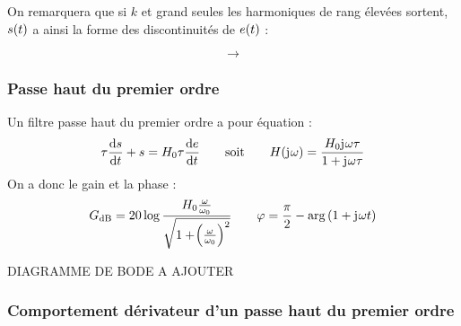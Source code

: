 \documentclass[a4paper,french,bookmarks]{book}
\begin{document}
    On remarquera que si $k$ et grand seules les harmoniques de rang élevées sortent, $s\!\left(t\right)$ a ainsi la forme des discontinuités de $e\!\left(t\right)$ :
    
    
    \begin{minipage}{0.48\linewidth}
        \begin{center}
        \end{center}
    \end{minipage}
    \begin{minipage}{0.04\linewidth}
        \[ \rightarrow \]
    \end{minipage}
    \begin{minipage}{0.48\linewidth}
        \begin{center}
        \end{center}
    \end{minipage}
    
    \subsubsection{Passe haut du premier ordre}
    
    Un filtre passe haut du premier ordre a pour équation :
    \[ \tau \dfrac{\mathrm d s}{\mathrm d t} + s = H_0\tau \dfrac{\mathrm d e}{\mathrm d t} \qquad\text{soit}\qquad H\!\left(\mathrm{j\mkern1mu}\omega\right) = \dfrac{H_0\mathrm{j\mkern1mu} \omega \tau}{1 + \mathrm{j\mkern1mu}\omega \tau}\]
    On a donc le gain et la phase :
    \[ G_\text{dB} = 20\log \dfrac{H_0\frac{\omega}{\omega_0} }{ \sqrt{1 + \p{\frac{\omega}{\omega_0}}^2}} \qquad \varphi = \dfrac{\pi}{2} - \arg{1 + \jj\omega t}\]
    
    DIAGRAMME DE BODE A AJOUTER
    
    \subsubsection{Comportement dérivateur d'un passe haut du premier ordre}
    
\end{document}
